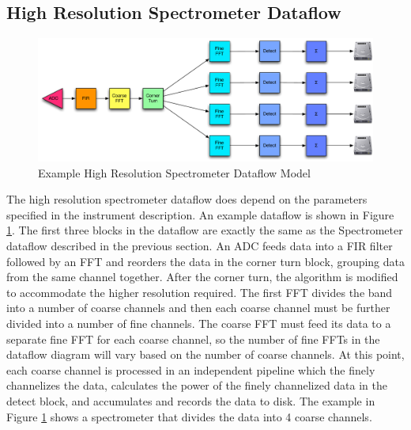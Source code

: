 \subsection{High Resolution Spectrometer Dataflow}

\begin{figure}[ht!]
  \centering
    \includegraphics[width=1\textwidth]{Images/C4/hires_spectrometer_dataflow.pdf}
  \caption[Example High Resolution Spectrometer Dataflow Model]{Example High Resolution Spectrometer Dataflow Model
  }

  \label{fig: C4/hires_spectrometer_dataflow.pdf}
\end{figure}

The high resolution spectrometer dataflow does depend on the parameters specified in the instrument description. 
An example dataflow is shown in Figure \ref{fig: C4/hires_spectrometer_dataflow.pdf}. 
The first three blocks in the dataflow are exactly the same as the Spectrometer dataflow described in the previous section. 
An ADC feeds data into a FIR filter followed by an FFT and reorders the data in the corner turn block, grouping data from the same channel together. 
After the corner turn, the algorithm is modified to accommodate the higher resolution required. 
The first FFT divides the band into a number of coarse channels and then each coarse channel must be further divided into a number of fine channels. 
The coarse FFT must feed its data to a separate fine FFT for each coarse channel, so the number of fine FFTs in the dataflow diagram will vary based on the number of coarse channels.
At this point, each coarse channel is processed in an independent pipeline which the finely channelizes the data, calculates the power of the finely channelized data in the detect block, and accumulates and records the data to disk. 
The example in Figure \ref{fig: C4/hires_spectrometer_dataflow.pdf} shows a spectrometer that divides the data into 4 coarse channels.

